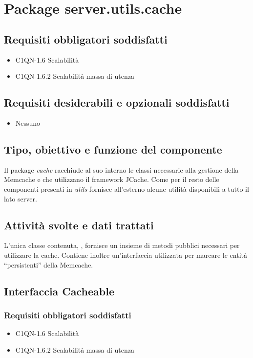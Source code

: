 \newpage
\section{Package server.utils.cache} %
\subsection*{Requisiti obbligatori soddisfatti}
\begin{itemize}
    \item C1QN-1.6 Scalabilit\`a
    \item C1QN-1.6.2 Scalabilit\`a massa di utenza
\end{itemize}
\subsection*{Requisiti desiderabili e opzionali soddisfatti}
\begin{itemize}
    \item Nessuno
\end{itemize}
\subsection*{Tipo, obiettivo e funzione del componente}
Il package \emph{cache} racchiude al suo interno le classi necessarie alla
gestione della Memcache e che utilizzano il framework JCache. Come per il resto
delle componenti presenti in \emph{utils} fornisce all'esterno alcune utilit\`a
disponibili a tutto il lato server. 
\subsection*{Attivit\`a svolte e dati trattati} L'unica classe contenuta,
, fornisce un insieme di metodi pubblici necessari per
utilizzare la cache. Contiene inoltre un'interfaccia utilizzata per marcare le
entit\`a ``persistenti'' della Memcache.


\subsection{Interfaccia Cacheable}
\subsubsection*{Requisiti obbligatori soddisfatti}
\begin{itemize}
    \item C1QN-1.6 Scalabilit\`a
    \item C1QN-1.6.2 Scalabilit\`a massa di utenza
\end{itemize}
